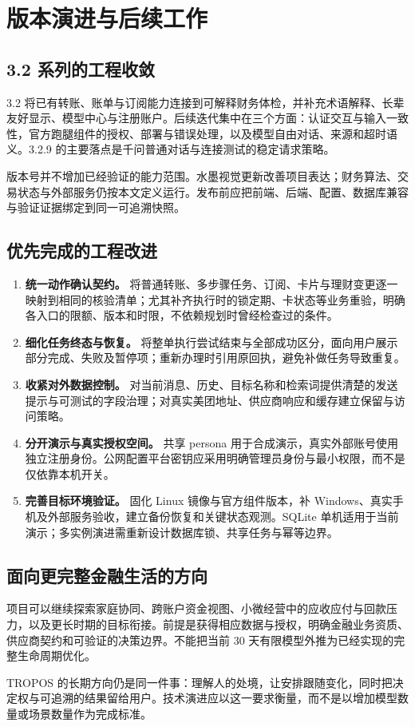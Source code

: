 \sectionstart
\section{版本演进与后续工作}
\subsection{3.2 系列的工程收敛}
3.2 将已有转账、账单与订阅能力连接到可解释财务体检，并补充术语解释、长辈友好显示、模型中心与注册账户。后续迭代集中在三个方面：认证交互与输入一致性，官方跑腿组件的授权、部署与错误处理，以及模型自由对话、来源和超时语义。3.2.9 的主要落点是千问普通对话与连接测试的稳定请求策略。

版本号并不增加已经验证的能力范围。水墨视觉更新改善项目表达；财务算法、交易状态与外部服务仍按本文定义运行。发布前应把前端、后端、配置、数据库兼容与验证证据绑定到同一可追溯快照。

\subsection{优先完成的工程改进}
\begin{enumerate}
\item \textbf{统一动作确认契约。} 将普通转账、多步骤任务、订阅、卡片与理财变更逐一映射到相同的核验清单；尤其补齐执行时的锁定期、卡状态等业务重验，明确各入口的限额、版本和时限，不依赖规划时曾经检查过的条件。
\item \textbf{细化任务终态与恢复。} 将整单执行尝试结束与全部成功区分，面向用户展示部分完成、失败及暂停项；重新办理时引用原回执，避免补做任务导致重复。
\item \textbf{收紧对外数据控制。} 对当前消息、历史、目标名称和检索词提供清楚的发送提示与可测试的字段治理；对真实美团地址、供应商响应和缓存建立保留与访问策略。
\item \textbf{分开演示与真实授权空间。} 共享 persona 用于合成演示，真实外部账号使用独立注册身份。公网配置平台密钥应采用明确管理员身份与最小权限，而不是仅依靠本机开关。
\item \textbf{完善目标环境验证。} 固化 Linux 镜像与官方组件版本，补 Windows、真实手机及外部服务验收，建立备份恢复和关键状态观测。SQLite 单机适用于当前演示；多实例演进需重新设计数据库锁、共享任务与幂等边界。
\end{enumerate}

\subsection{面向更完整金融生活的方向}
项目可以继续探索家庭协同、跨账户资金视图、小微经营中的应收应付与回款压力，以及更长时期的目标衔接。前提是获得相应数据与授权，明确金融业务资质、供应商契约和可验证的决策边界。不能把当前 30 天有限模型外推为已经实现的完整生命周期优化。

TROPOS 的长期方向仍是同一件事：理解人的处境，让安排跟随变化，同时把决定权与可追溯的结果留给用户。技术演进应以这一要求衡量，而不是以增加模型数量或场景数量作为完成标准。
